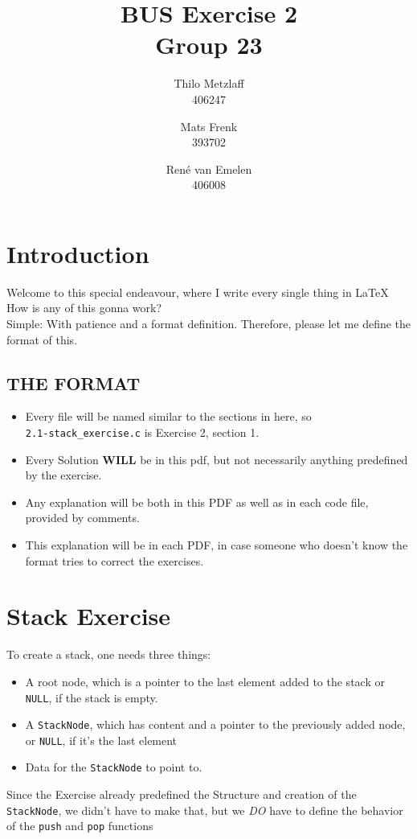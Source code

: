 \documentclass[a4paper, 11pt]{article}
\author{Thilo Metzlaff\\406247 \and Mats Frenk\\393702\and René van Emelen\\406008}
\title{BUS Exercise 2 \\ \Large Group 23}
\begin{document}
    \maketitle
    \newpage

    \tableofcontents
    \newpage

    \section*{Introduction}
    Welcome to this special endeavour, where I write every single thing in \LaTeX{}
    How is any of this gonna work?\\
    Simple: With patience and a format definition. Therefore, please let me define the format of this.

    \subsection*{THE FORMAT}
    \begin{itemize}
        \item Every file will be named similar to the sections in here, so\\
              \texttt{2.1-stack\_exercise.c} is Exercise 2, section 1.
        \item Every Solution \textbf{WILL} be in this pdf, but not necessarily 
              anything predefined by the exercise.
        \item Any explanation will be both in this PDF as well as in each code file, 
              provided by comments.
        \item This explanation will be in each PDF, in case someone who doesn't
              know the format tries to correct the exercises.
    \end{itemize}
    \newpage

    \section{Stack Exercise}
    To create a stack, one needs three things:
    \begin{itemize}
        \item A root node, which is a pointer to the last element added
              to the stack or \lstinline{NULL}, if the stack is empty.
        \item A \texttt{StackNode}, which has content and a pointer to the previously 
              added node, or \lstinline{NULL}, if it's the last element
        \item Data for the \texttt{StackNode} to point to.
    \end{itemize}
    Since the Exercise already predefined the Structure and creation of the \texttt{StackNode}, 
    we didn't have to make that, but we \emph{DO} have to define the behavior of the \texttt{push} and
    \texttt{pop} functions
\end{document}
